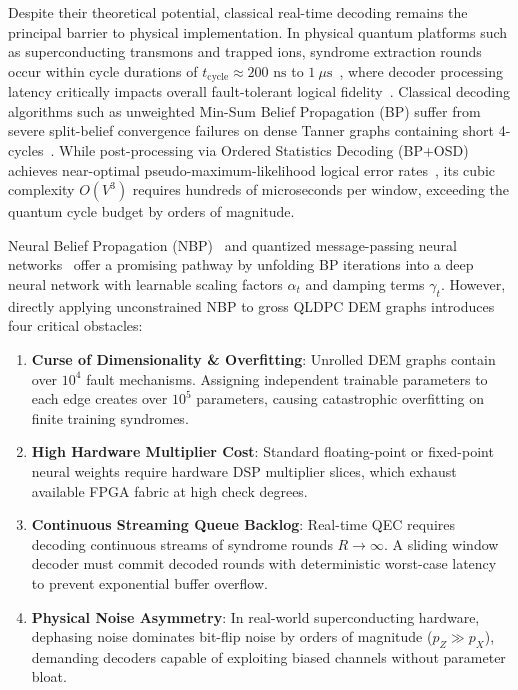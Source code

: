 \documentclass[journal]{IEEEtran}
\begin{document}
Despite their theoretical potential, classical real-time decoding remains the principal barrier to physical implementation. In physical quantum platforms such as superconducting transmons and trapped ions, syndrome extraction rounds occur within cycle durations of $t_{\text{cycle}} \approx 200\text{ ns}$ to $1~\mu\text{s}$~\cite{bravyi2024high}, where decoder processing latency critically impacts overall fault-tolerant logical fidelity~\cite{khalid2025impacts}. Classical decoding algorithms such as unweighted Min-Sum Belief Propagation (BP) suffer from severe split-belief convergence failures on dense Tanner graphs containing short 4-cycles~\cite{roffe2020decoding}. While post-processing via Ordered Statistics Decoding (BP+OSD) achieves near-optimal pseudo-maximum-likelihood logical error rates~\cite{roffe2020decoding,panteleev2021degenerate,buchberger2021pruning,geiselhart2023learning,chen2002near,fossorier1995soft}, its cubic complexity $O(V^3)$ requires hundreds of microseconds per window, exceeding the quantum cycle budget by orders of magnitude.

Neural Belief Propagation (NBP)~\cite{nachmani2018deep,liu2019neural} and quantized message-passing neural networks~\cite{buchberger2021pruning,geiselhart2023learning,chen2002near,fossorier1995soft,esser2020learned,rabeti2026multiple} offer a promising pathway by unfolding BP iterations into a deep neural network with learnable scaling factors $\alpha_t$ and damping terms $\gamma_t$. However, directly applying unconstrained NBP to gross QLDPC DEM graphs introduces four critical obstacles:
\begin{enumerate}
    \item \textbf{Curse of Dimensionality \& Overfitting}: Unrolled DEM graphs contain over $10^4$ fault mechanisms. Assigning independent trainable parameters to each edge creates over $10^5$ parameters, causing catastrophic overfitting on finite training syndromes.
    \item \textbf{High Hardware Multiplier Cost}: Standard floating-point or fixed-point neural weights require hardware DSP multiplier slices, which exhaust available FPGA fabric at high check degrees.
    \item \textbf{Continuous Streaming Queue Backlog}: Real-time QEC requires decoding continuous streams of syndrome rounds $R \to \infty$. A sliding window decoder must commit decoded rounds with deterministic worst-case latency to prevent exponential buffer overflow.
    \item \textbf{Physical Noise Asymmetry}: In real-world superconducting hardware, dephasing noise dominates bit-flip noise by orders of magnitude ($p_Z \gg p_X$), demanding decoders capable of exploiting biased channels without parameter bloat.
\end{enumerate}
\end{document}
